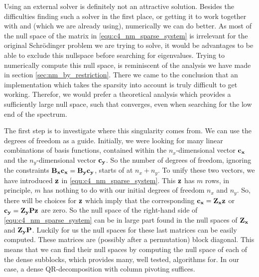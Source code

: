  Using an external solver is definitely not an attractive solution. Besides the difficulties finding such a solver in the first place, or getting it to work together with \slepc and \Eigen (which we are already using), numerically we can do better. As most of the null space of the matrix in \eqref{equ:c4_nm_sparse_system} is irrelevant for the original Schrödinger problem we are trying to solve, it would be advantages to be able to exclude this nullspace before searching for eigenvalues. Trying to numerically compute this null space, is reminiscent of the analysis we have made in section \ref{sec:nm_by_restriction}. There we came to the conclusion that an implementation which takes the sparsity into account is truly difficult to get working. Therefor, we would prefer a theoretical analysis which provides a sufficiently large null space, such that \slepc converges, even when searching for the low end of the spectrum.

The first step is to investigate where this singularity comes from. We can use the degrees of freedom as a guide. Initially, we were looking for many linear combinations of basis functions, contained within the $n_x$-dimensional vector $\vb{c_x}$ and the $n_y$-dimensional vector $\vb{c_y}$. So the number of degrees of freedom, ignoring the constraints $\vb{B_x}\vb{c_x} = \vb{B_y}\vb{c_y}$, starts of at $n_x + n_y$. To unify these two vectors, we have introduced $\vb{z}$ in \eqref{equ:c4_nm_sparse_system}. This $\vb{z}$ has $m$ rows, in principle, $m$ has nothing to do with our initial degrees of freedom $n_x$ and $n_y$. So, there will be choices for $\vb{z}$ which imply that the corresponding $\vb{c_x} = \vb{Z_x} \vb{z}$
or $\vb{c_y} = \vb{Z_y} \vb{P} \vb{z}$ are zero. So the null space of the right-hand side of \eqref{equ:c4_nm_sparse_system} can be in large part found in the null spaces of $\vb{Z_x}$ and $\vb{Z_y} \vb{P}$. Luckily for us the null spaces for these last matrices can be easily computed. These matrices are (possibly after a permutation) block diagonal. This means that we can find their null spaces by computing the null space of each of the dense subblocks, which \Eigen provides many, well tested, algorithms for. In our case, a dense QR-decomposition with column pivoting suffices.

